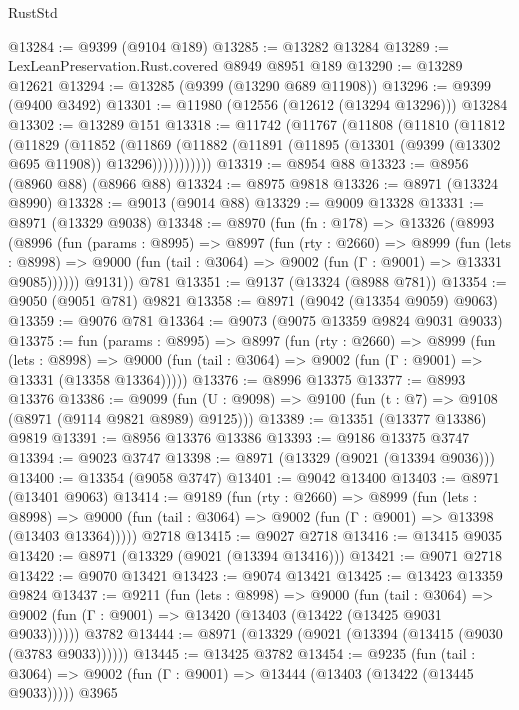 \begin{lexlean}{RustStd}
\begin{coremodule}
@13284 := @9399 (@9104 @189)
@13285 := @13282 @13284
@13289 := LexLeanPreservation.Rust.covered @8949 @8951 @189
@13290 := @13289 @12621
@13294 := @13285 (@9399 (@13290 @689 @11908))
@13296 := @9399 (@9400 @3492)
@13301 := @11980 (@12556 (@12612 (@13294 @13296))) @13284
@13302 := @13289 @151
@13318 := @11742
    (@11767
      (@11808
        (@11810
          (@11812
            (@11829
              (@11852
                (@11869
                  (@11882 (@11891 (@11895 (@13301 (@9399 (@13302 @695 @11908)) @13296)))))))))))
@13319 := @8954 @88
@13323 := @8956 (@8960 @88) (@8966 @88)
@13324 := @8975 @9818
@13326 := @8971 (@13324 @8990)
@13328 := @9013 (@9014 @88)
@13329 := @9009 @13328
@13331 := @8971 (@13329 @9038)
@13348 := @8970
    (fun (fn : @178) =>
    @13326
      (@8993
        (@8996
          (fun (params : @8995) =>
          @8997
            (fun (rty : @2660) =>
            @8999
              (fun (lets : @8998) =>
              @9000 (fun (tail : @3064) => @9002 (fun (Γ : @9001) => @13331 @9085))))))
        @9131))
    @781
@13351 := @9137 (@13324 (@8988 @781))
@13354 := @9050 (@9051 @781) @9821
@13358 := @8971 (@9042 (@13354 @9059) @9063)
@13359 := @9076 @781
@13364 := @9073 (@9075 @13359 @9824 @9031 @9033)
@13375 := fun (params : @8995) =>
  @8997
    (fun (rty : @2660) =>
    @8999
      (fun (lets : @8998) =>
      @9000 (fun (tail : @3064) => @9002 (fun (Γ : @9001) => @13331 (@13358 @13364)))))
@13376 := @8996 @13375
@13377 := @8993 @13376
@13386 := @9099 (fun (U : @9098) => @9100 (fun (t : @7) => @9108 (@8971 (@9114 @9821 @8989) @9125)))
@13389 := @13351 (@13377 @13386) @9819
@13391 := @8956 @13376 @13386
@13393 := @9186 @13375 @3747
@13394 := @9023 @3747
@13398 := @8971 (@13329 (@9021 (@13394 @9036)))
@13400 := @13354 (@9058 @3747)
@13401 := @9042 @13400
@13403 := @8971 (@13401 @9063)
@13414 := @9189
    (fun (rty : @2660) =>
    @8999
      (fun (lets : @8998) =>
      @9000 (fun (tail : @3064) => @9002 (fun (Γ : @9001) => @13398 (@13403 @13364)))))
    @2718
@13415 := @9027 @2718
@13416 := @13415 @9035
@13420 := @8971 (@13329 (@9021 (@13394 @13416)))
@13421 := @9071 @2718
@13422 := @9070 @13421
@13423 := @9074 @13421
@13425 := @13423 @13359 @9824
@13437 := @9211
    (fun (lets : @8998) =>
    @9000
      (fun (tail : @3064) =>
      @9002 (fun (Γ : @9001) => @13420 (@13403 (@13422 (@13425 @9031 @9033))))))
    @3782
@13444 := @8971 (@13329 (@9021 (@13394 (@13415 (@9030 (@3783 @9033))))))
@13445 := @13425 @3782
@13454 := @9235
    (fun (tail : @3064) => @9002 (fun (Γ : @9001) => @13444 (@13403 (@13422 (@13445 @9033)))))
    @3965

\end{coremodule}
\end{lexlean}
